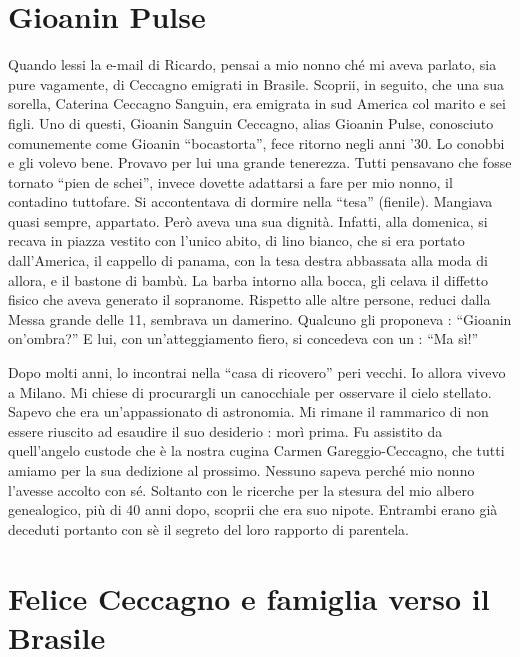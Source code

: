 \documentclass[a4paper,10pt]{book}
\begin{document}
\section*{Gioanin Pulse}

Quando lessi la e-mail di Ricardo, pensai a mio nonno ché mi aveva parlato, sia pure vagamente, di Ceccagno emigrati in Brasile.\newline
Scoprii, in seguito, che una sua sorella, Caterina Ceccagno Sanguin, era emigrata in sud America col marito e sei figli. Uno di questi, Gioanin Sanguin Ceccagno, alias Gioanin Pulse, conosciuto comunemente come Gioanin “bocastorta”, fece ritorno negli anni ’30. Lo conobbi e gli volevo bene. Provavo per lui una grande tenerezza. Tutti pensavano che fosse tornato “pien de schei”, invece dovette adattarsi a fare per mio nonno, il contadino tuttofare. Si accontentava di dormire nella “tesa” (fienile). Mangiava quasi sempre, appartato. Però aveva una sua dignità.\newline
Infatti, alla domenica, si recava in piazza vestito con l’unico abito, di lino bianco, che si era portato dall’America, il cappello di panama, con la tesa destra abbassata alla moda di allora, e il bastone di bambù. La barba intorno alla bocca, gli celava il diffetto fisico che aveva generato il sopranome. Rispetto alle altre persone, reduci dalla Messa grande delle 11, sembrava un damerino. Qualcuno gli proponeva : “Gioanin on’ombra?” E lui, con un’atteggiamento fiero, si concedeva con un : “Ma sì!”

Dopo molti anni, lo incontrai nella “casa di ricovero” peri vecchi. Io allora vivevo a Milano. Mi chiese di procurargli un canocchiale per osservare il cielo stellato. Sapevo che era un’appassionato di astronomia. Mi rimane il rammarico di non essere riuscito ad esaudire il suo desiderio : morì prima. Fu assistito da quell’angelo custode che è la nostra cugina Carmen Gareggio-Ceccagno, che tutti amiamo per la sua dedizione al prossimo.\newline
Nessuno sapeva perché mio nonno l’avesse accolto con sé. Soltanto con le ricerche per la stesura del mio albero genealogico, più di 40 anni dopo, scoprii che era suo nipote. Entrambi erano già deceduti portanto con sè il segreto del loro rapporto di parentela.

\section*{Felice Ceccagno e famiglia verso il Brasile}
\end{document}
